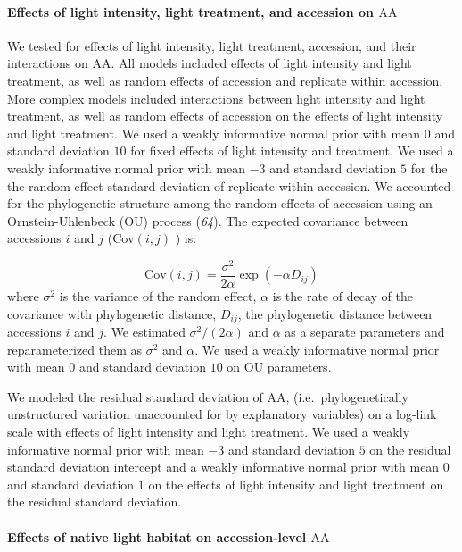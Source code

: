 \documentclass[
  letterpaper,
  DIV=11,
  numbers=noendperiod]{scrartcl}
\let\oldparagraph\paragraph
\renewcommand{\paragraph}[1]{\oldparagraph{#1}\mbox{}}
\newcommand{\aax}{$\mathrm{AA}$}
\begin{document}
\paragraph{\texorpdfstring{Effects of light intensity, light treatment,
and accession on
\aax}{Effects of light intensity, light treatment, and accession on }}\label{effects-of-light-intensity-light-treatment-and-accession-on}

We tested for effects of light intensity, light treatment, accession,
and their interactions on \aax. All models included effects of light
intensity and light treatment, as well as random effects of accession
and replicate within accession. More complex models included
interactions between light intensity and light treatment, as well as
random effects of accession on the effects of light intensity and light
treatment. We used a weakly informative normal prior with mean \(0\) and
standard deviation \(10\) for fixed effects of light intensity and
treatment. We used a weakly informative normal prior with mean \(-3\)
and standard deviation \(5\) for the the random effect standard
deviation of replicate within accession. We accounted for the
phylogenetic structure among the random effects of accession using an
Ornstein-Uhlenbeck (OU) process (\emph{64}). The expected covariance
between accessions \(i\) and \(j\) (\(\text{Cov}(i, j)\) ) is:

\[\text{Cov}(i, j) = \frac{\sigma^2}{2 \alpha} \exp(-\alpha D_{ij})\]
where \(\sigma^2\) is the variance of the random effect, \(\alpha\) is
the rate of decay of the covariance with phylogenetic distance,
\(D_{ij}\), the phylogenetic distance between accessions \(i\) and
\(j\). We estimated \(\sigma^2 / (2 \alpha)\) and \(\alpha\) as a
separate parameters and reparameterized them as \(\sigma^2\) and
\(\alpha\). We used a weakly informative normal prior with mean \(0\)
and standard deviation \(10\) on OU parameters.

We modeled the residual standard deviation of \aax,
(i.e.~phylogenetically unstructured variation unaccounted for by
explanatory variables) on a log-link scale with effects of light
intensity and light treatment. We used a weakly informative normal prior
with mean \(-3\) and standard deviation \(5\) on the residual standard
deviation intercept and a weakly informative normal prior with mean
\(0\) and standard deviation \(1\) on the effects of light intensity and
light treatment on the residual standard deviation.

\paragraph{\texorpdfstring{Effects of native light habitat on
accession-level
\aax}{Effects of native light habitat on accession-level }}\label{effects-of-native-light-habitat-on-accession-level}
\end{document}
